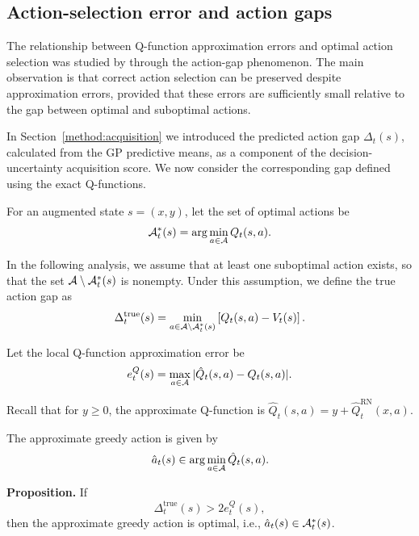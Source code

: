 \subsection{Action-selection error and action gaps}
\label{theory:action-gap}

The relationship between Q-function approximation errors and
optimal action selection was studied by \cite{farahmand-2011}
through the action-gap phenomenon. The main observation is
that correct action selection can be preserved despite
approximation errors, provided that these errors are
sufficiently small relative to the gap between optimal
and suboptimal actions.

In Section~\ref{method:acquisition} we introduced the
predicted action gap $\Delta_t(s)$, calculated from the
GP predictive means, as a component of the
decision-uncertainty acquisition score. We now consider
the corresponding gap defined using the exact Q-functions.

For an augmented state $s=(x,y)$, let the set of optimal
actions be
\begin{equation}
	\mathcal{A}_t^*(s)
	=
	\arg\min_{a\in\mathcal{A}} Q_t(s,a).
	\label{optimal-action-set}
\end{equation}

In the following analysis, we assume that at least one
suboptimal action exists, so that the set
$\mathcal{A}\setminus\mathcal{A}_t^*(s)$ is nonempty.
Under this assumption, we define the true action gap as
\begin{equation}
	\Delta_t^{\text{true}}(s)
	=
	\min_{a\in\mathcal{A}\setminus\mathcal{A}_t^*(s)}
	\left[Q_t(s,a)-V_t(s)\right].
	\label{true-action-gap}
\end{equation}

Let the local Q-function approximation error be
\begin{equation}
	e_t^Q(s)
	=
	\max_{a\in\mathcal{A}}
	|\hat Q_t(s,a)-Q_t(s,a)|.
	\label{local-q-error}
\end{equation}

Recall that for $y\geq0$, the approximate Q-function
is $\hat Q_t(s,a)=y+\hat Q_t^{\text{RN}}(x,a)$.

The approximate greedy action is given by
\begin{equation}
	\hat a_t(s)
	\in\arg\min_{a\in\mathcal{A}}\hat Q_t(s,a).
	\notag
	\label{approx-greedy-action}
\end{equation}

\textbf{Proposition.}
If
\begin{equation}
	\Delta_t^{\text{true}}(s)>2e_t^Q(s),
	\label{action-gap-condition}
\end{equation}
then the approximate greedy action is optimal,
i.e., $\hat a_t(s)\in\mathcal{A}_t^*(s)$.

